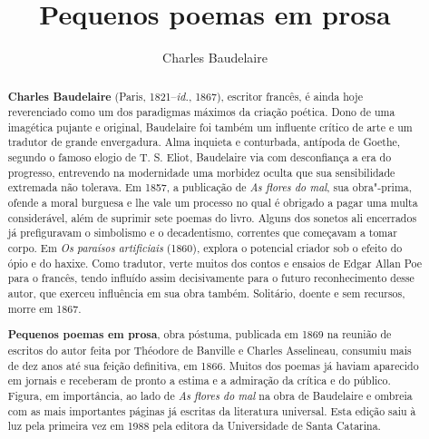 \documentclass[12pt]{extarticle}
\begin{document}
\newcommand{\AutorLivro}{Charles Baudelaire}
\newcommand{\TituloLivro}{Pequenos poemas em prosa}
\newcommand{\Tema}{Ficção, mistério e fantasia}
\newcommand{\Genero}{Poema}
\newcommand{\imagemCapa}{./images/PNLD0010-MP-C.png}
\newcommand{\issnppub}{978-65-994412-1-9}
\newcommand{\issnepub}{978-65-994412-2-6}
\newcommand{\colaborador}{Bruno Gradella\\ e Vicente Castro}


\title{\TituloLivro}
\author{\AutorLivro}
\def\authornotes{\colaborador}

\date{}
\maketitle

\begin{abstract}

\textbf{Charles Baudelaire} (Paris, 1821--\textit{id.}, 1867), escritor francês, é
 ainda hoje reverenciado como um dos paradigmas máximos da criação poética.
 Dono de uma imagética pujante e original, Baudelaire foi também um
 influente crítico de arte e um tradutor de grande envergadura. Alma
 inquieta e conturbada, antípoda de Goethe, segundo o famoso elogio de
 T. S. Eliot, Baudelaire via com desconfiança a era do progresso,
 entrevendo na modernidade uma morbidez oculta que sua sensibilidade
 extremada não tolerava. Em 1857, a publicação de \textit{As flores do mal}, sua
 obra"-prima, ofende a moral burguesa e lhe vale um processo no qual é
 obrigado a pagar uma multa considerável, além de suprimir sete poemas do livro.
 Alguns dos sonetos ali encerrados
 já prefiguravam o simbolismo e o decadentismo, correntes que começavam a
 tomar corpo. Em \textit{Os paraísos artificiais} (1860), explora o potencial
 criador sob o efeito do ópio e do haxixe. Como tradutor, verte
 muitos dos contos e ensaios de  Edgar Allan Poe para o francês, tendo influído assim decisivamente
 para o futuro reconhecimento desse autor, que 
 exerceu influência em sua obra também. Solitário, doente e sem recursos,
 morre em 1867.

\textbf{Pequenos poemas em prosa}, obra póstuma, publicada em 1869 na reunião
 de escritos do autor feita por Théodore de Banville e Charles Asselineau,
 consumiu mais de dez anos até sua feição definitiva, em 1866. Muitos dos poemas
 já haviam aparecido em jornais e receberam de pronto a estima e a
 admiração da crítica e do público. Figura, em importância, ao lado de
 \textit{As flores do mal} na obra de Baudelaire e ombreia com
 as mais importantes páginas já escritas da literatura universal. Esta edição
saiu à luz pela primeira vez em 1988 pela editora da Universidade de Santa Catarina.

\end{abstract}
\end{document}
